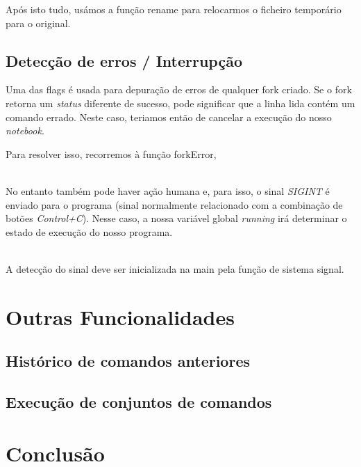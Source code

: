 \documentclass[11pt,a4paper]{report}
\begin{document}
Após isto tudo, usámos a função rename para relocarmos o ficheiro temporário para o original.



\pagebreak
\section{Detecção de erros / Interrupção}

Uma das flags é usada para depuração de erros de qualquer fork criado. Se o fork retorna um \textit{status} diferente de sucesso, pode significar que a linha lida contém um comando errado.
Neste caso, teriamos então de cancelar a execução do nosso \textit{notebook}.

Para resolver isso, recorremos à função forkError,


~\\

No entanto também pode haver ação humana e, para isso, o sinal \textit{SIGINT} é enviado para o programa (sinal normalmente relacionado com a combinação de botões \textit{Control+C}).
Nesse caso, a nossa variável global \textit{running} irá determinar o estado de execução do nosso programa.


~\\

A detecção do sinal deve ser inicializada na main pela função de sistema signal.
\raggedbottom
\pagebreak

\chapter{Outras Funcionalidades}
\section{Histórico de comandos anteriores}

%
%

\section{Execução de conjuntos de comandos}



\chapter{Conclusão}
\end{document}

